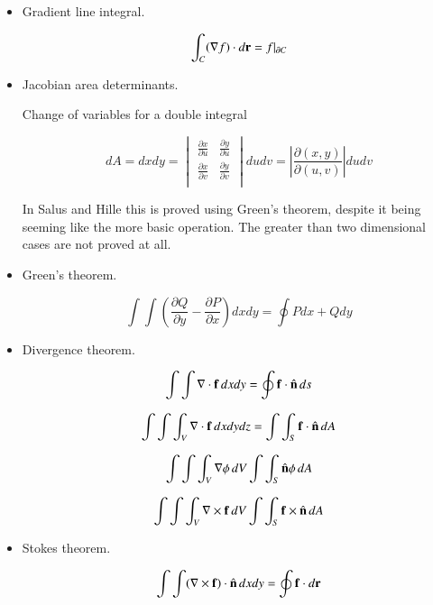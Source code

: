\documentclass{article}
\newcommand{\grad}[0]{\nabla}
\newcommand{\PD}[2]{\frac{\partial {#2}}{\partial {#1}}}
\newcommand{\Abs}[1]{\left\lvert{#1}\right\rvert}
\begin{document}
\begin{itemize}

\item Gradient line integral. 

\begin{equation}\label{eqn:lineintegral}
\int_C (\grad f) \cdot d\Br = f \vert_{\partial C}
\end{equation}

\item Jacobian area determinants. 

Change of variables for a double integral

\begin{equation}
dA = dx dy =
\begin{vmatrix}
\PD{u}{x} & \PD{u}{y} \\
\PD{v}{x} & \PD{v}{y} \\
\end{vmatrix}
du dv
= \Abs{ \PD{(u,v)}{(x,y)} } du dv
\end{equation}

In Salus and Hille this is proved using Green's theorem, despite it 
being seeming like the more basic operation.  The greater than two
dimensional cases are not proved at all.

\item Green's theorem. 

\begin{equation}\label{eqn:greens}
\int\int \left(\PD{y}{Q} - \PD{x}{P}\right) dx dy = \oint P dx + Q dy
\end{equation}

\item Divergence theorem. 

\begin{equation}\label{eqn:divergenceplane}
\int\int \grad \cdot \Bf\, dx dy = \oint \Bf \cdot \ncap\, ds
\end{equation}

\begin{equation}\label{eqn:divergencevolume}
\int\int\int_V \grad \cdot \Bf\, dx dy dz = \int\int_S \Bf \cdot \ncap\, dA
\end{equation}

\begin{equation}\label{eqn:divergencegrad}
\int\int\int_V \grad \phi\, dV \int\int_S \ncap \phi\, dA
\end{equation}

\begin{equation}\label{eqn:divergencegradcross}
\int\int\int_V \grad \cross \Bf\, dV \int\int_S \Bf \cross \ncap\, dA
\end{equation}

\item Stokes theorem. 

\begin{equation}\label{eqn:stokes}
\int\int (\grad \cross \Bf) \cdot \ncap\, dx dy = \oint \Bf \cdot d\Br
\end{equation}

\end{itemize}
\end{document}
